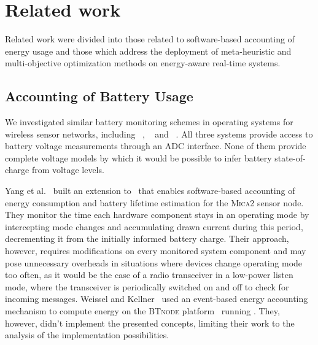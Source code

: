 \section{Related work}
\label{sec:related}

Related work were divided into those related to software-based accounting of
energy usage and those which address the deployment of meta-heuristic and
multi-objective optimization methods on energy-aware real-time systems.

\subsection{Accounting of Battery Usage}

We investigated similar battery monitoring schemes in operating systems for
wireless sensor networks, including \tinyos~\cite{Polastre:2005},
\mantis~\cite{Bhatti:2005} and \contiki~\cite{Dunkels:2004}. All three systems
provide access to battery voltage measurements through an ADC interface.
None of them provide complete voltage models by which it would be possible to
infer battery state-of-charge from voltage levels.

Yang et al.~\cite{Yang:2007} built an extension to \tinyos~that enables
software-based accounting of energy consumption and battery lifetime estimation
for the \textsc{Mica2} sensor node. They monitor the time each hardware
component stays in an operating mode by intercepting mode changes and
accumulating drawn current during this period, decrementing it from the
initially informed battery charge. Their approach, however, requires
modifications on every monitored system component and may pose unnecessary
overheads in situations where devices change operating mode too often, as it
would be the case of a radio transceiver in a low-power listen mode, where the
transceiver is periodically switched on and off to check for incoming messages.
Weissel and Kellner~\cite{Weissel:2006} used an event-based energy accounting
mechanism to compute energy on the \textsc{BTnode} platform~\cite{Beutel:2004}
running \tinyos. They, however, didn't implement the presented concepts,
limiting their work to the analysis of the implementation possibilities.

